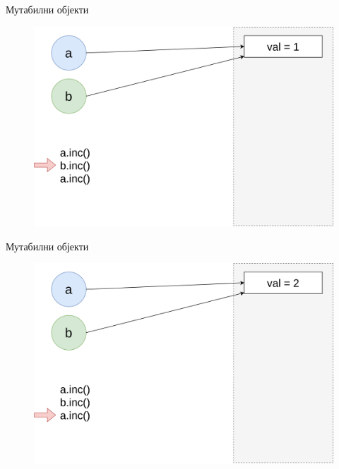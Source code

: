 \documentclass[xcolor=table]{beamer}
\begin{document}
    \begin{frame}{Мутабилни објекти}
        \begin{figure}
            \centering
            \includegraphics[height=0.7\textheight,keepaspectratio]{images/mut1.png}
        \end{figure}
    \end{frame}
    
    \begin{frame}{Мутабилни објекти}
        \begin{figure}
            \centering
            \includegraphics[height=0.7\textheight,keepaspectratio]{images/mut2.png}
        \end{figure}
    \end{frame}
    
\end{document}
